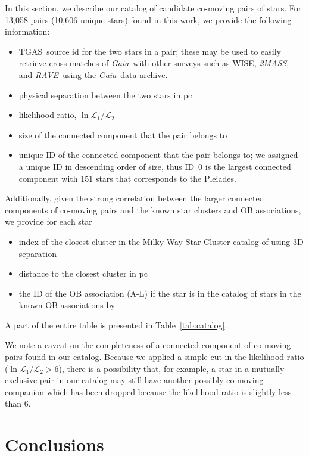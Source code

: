 \documentclass[manuscript, letterpaper]{aastex6}
\newcommand{\project}[1]{\textsl{#1}}
\newcommand{\acronym}[1]{{\small{#1}}}
\newcommand{\gaia}{\project{Gaia}}
\newcommand{\rave}{\project{\acronym{RAVE}}}
\newcommand{\tmass}{\project{\acronym{2MASS}}}
\newcommand{\tgas}{\acronym{TGAS}}
\begin{document}
In this section, we describe our catalog of candidate co-moving pairs of stars.
For 13,058 pairs (10,606 unique stars) found in this work,
we provide the following information:
%
\begin{itemize}
  \item \tgas\ source id for the two stars in a pair; these may be used to easily
    retrieve cross matches of \gaia\ with other surveys such as WISE, \tmass, and
    \rave\ using the \gaia\ data archive.
  \item physical separation between the two stars in pc
  \item likelihood ratio, $\ln \mathcal{L}_1 /\mathcal{L}_2$
  \item size of the connected component that the pair belongs to
  \item unique ID of the connected component that the pair belongs to; we assigned
    a unique ID in descending order of size, thus ID~0 is the largest connected component with 151 stars that corresponds to the Pleiades.
\end{itemize}
%
Additionally, given the strong correlation between the larger connected components
of co-moving pairs
and the known star clusters and OB associations, we provide for each star
%
\begin{itemize}
  \item index of the closest cluster in the Milky Way Star Cluster catalog of
  \citet{Kharchenko:2016aa} using 3D separation
  \item distance to the closest cluster in pc
  \item the ID of the OB association (A-L) if the star is in the catalog of
  stars in the known OB associations by \citet{de-Zeeuw:1999aa}
\end{itemize}
%
A part of the entire table is presented in Table~\ref{tab:catalog}.



We note a caveat on the completeness of a connected component of co-moving
pairs found in our catalog. Because we applied a simple cut in the likelihood
ratio ($\ln \mathcal{L}_1 /\mathcal{L}_2>6$), there is a possibility that, for
example, a star in a mutually exclusive pair in our catalog may still have
another possibly co-moving companion which has been dropped because the
likelihood ratio is slightly less than 6.

\section{Conclusions}\label{sec:conclusions}
\end{document}
